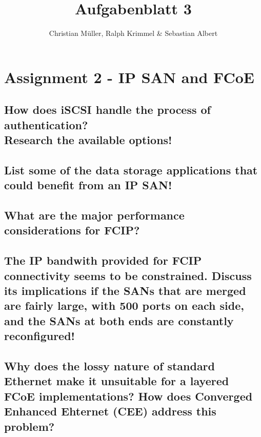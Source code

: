 \documentclass{article}
\title{Aufgabenblatt 3}
\author{Christian Müller, Ralph Krimmel \& Sebastian Albert }
\begin{document}
\maketitle

\section*{Assignment 2 - IP SAN and FCoE}

\subsection{How does iSCSI handle the process of authentication?\\Research the available options!}

\subsection{List some of the data storage applications that could benefit from an IP SAN!}

\subsection{What are the major performance considerations for FCIP?}

\subsection{The IP bandwith provided for FCIP connectivity seems to be constrained.
	Discuss its implications if the SANs that are merged are fairly large,
	with 500 ports on each side, and the SANs at both ends are constantly reconfigured!}

\subsection{Why does the lossy nature of standard Ethernet make it unsuitable for a layered FCoE implementations?
	How does Converged Enhanced Ehternet (CEE) address this problem?}
\end{document}
